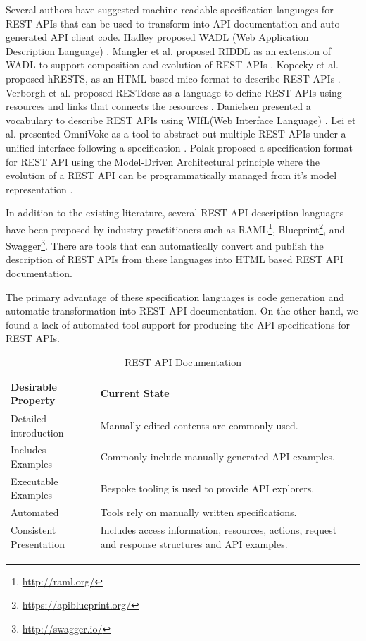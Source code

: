 \documentclass[10pt, conference]{IEEEtran}
\begin{document}
Several authors have suggested machine readable specification languages for REST APIs that can be used to transform into API documentation and auto generated API client code. Hadley proposed WADL (Web Application Description Language) \cite{hadley2006web}. Mangler et al. proposed RIDDL as an extension of WADL to support composition and evolution of REST APIs \cite{mangler2010origin}. Kopecky et al. proposed hRESTS, as an HTML based mico-format to describe REST APIs \cite{Kopecky_hrests}. Verborgh et al. proposed RESTdesc as a language to define REST APIs using resources and links that connects the resources \cite{RESTdesc}. Danielsen presented a vocabulary to describe REST APIs using WIfL(Web Interface Language) \cite{Danielsen_validation}. Lei et al. presented OmniVoke as a tool to abstract out multiple REST APIs under a unified interface following a specification \cite{Ning_omnivoke}. Polak proposed a specification format for REST API using the Model-Driven Architectural principle where the evolution of a REST API can be programmatically managed from it's model representation \cite{Polak:2015:RAM:2790798.2790820}.

In addition to the existing literature, several REST API description languages have been proposed by industry practitioners such as RAML\footnote{\url{http://raml.org/}}, Blueprint\footnote{\url{https://apiblueprint.org/}}, and Swagger\footnote{\url{http://swagger.io/}}. There are tools that can automatically convert and publish the description of REST APIs from these languages into HTML based REST API documentation.

The primary advantage of these specification languages is code generation and automatic transformation into REST API documentation. On the other hand, we found a lack of automated tool support for producing the API specifications for REST APIs.

\begin{table}[!tbh]
  \caption{REST API Documentation}
  \label{table:rest_apis}
\begin{tabular}{|p{1in} | p{2.2in}|}
\hline
\textbf{Desirable Property} & \textbf{Current State} \\
\hline
Detailed introduction &
Manually edited contents are commonly used.
 \\
\hline
Includes Examples &
Commonly include manually generated API examples.
 \\
\hline
Executable Examples &
Bespoke tooling is used to provide API explorers.
 \\
\hline
Automated &
Tools rely on manually written specifications.\\
\hline
Consistent Presentation &
Includes access information, resources, actions, request and response structures and API examples.\\
\hline
\end{tabular}
\end{table}
\end{document}
